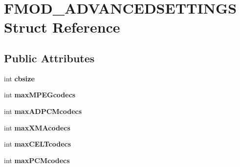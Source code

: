 \hypertarget{struct_f_m_o_d___a_d_v_a_n_c_e_d_s_e_t_t_i_n_g_s}{\section{F\-M\-O\-D\-\_\-\-A\-D\-V\-A\-N\-C\-E\-D\-S\-E\-T\-T\-I\-N\-G\-S Struct Reference}
\label{struct_f_m_o_d___a_d_v_a_n_c_e_d_s_e_t_t_i_n_g_s}
}
\subsection*{Public Attributes}
\begin{DoxyCompactItemize}
\item 
\hypertarget{struct_f_m_o_d___a_d_v_a_n_c_e_d_s_e_t_t_i_n_g_s_a45f37c714e81702c153beaeeaf5789d9}{int {\bfseries cbsize}}\label{struct_f_m_o_d___a_d_v_a_n_c_e_d_s_e_t_t_i_n_g_s_a45f37c714e81702c153beaeeaf5789d9}

\item 
\hypertarget{struct_f_m_o_d___a_d_v_a_n_c_e_d_s_e_t_t_i_n_g_s_ac38a94fd8d9b1ad4ed77d111cfcafa71}{int {\bfseries max\-M\-P\-E\-Gcodecs}}\label{struct_f_m_o_d___a_d_v_a_n_c_e_d_s_e_t_t_i_n_g_s_ac38a94fd8d9b1ad4ed77d111cfcafa71}

\item 
\hypertarget{struct_f_m_o_d___a_d_v_a_n_c_e_d_s_e_t_t_i_n_g_s_afebaec0ba3caa0367c9184416bd74f2a}{int {\bfseries max\-A\-D\-P\-C\-Mcodecs}}\label{struct_f_m_o_d___a_d_v_a_n_c_e_d_s_e_t_t_i_n_g_s_afebaec0ba3caa0367c9184416bd74f2a}

\item 
\hypertarget{struct_f_m_o_d___a_d_v_a_n_c_e_d_s_e_t_t_i_n_g_s_a4c351e7bc430c6c9aa9c87ad5fae8324}{int {\bfseries max\-X\-M\-Acodecs}}\label{struct_f_m_o_d___a_d_v_a_n_c_e_d_s_e_t_t_i_n_g_s_a4c351e7bc430c6c9aa9c87ad5fae8324}

\item 
\hypertarget{struct_f_m_o_d___a_d_v_a_n_c_e_d_s_e_t_t_i_n_g_s_a0f51ebed22a9eda603d37e2f9ccf5376}{int {\bfseries max\-C\-E\-L\-Tcodecs}}\label{struct_f_m_o_d___a_d_v_a_n_c_e_d_s_e_t_t_i_n_g_s_a0f51ebed22a9eda603d37e2f9ccf5376}

\item 
\hypertarget{struct_f_m_o_d___a_d_v_a_n_c_e_d_s_e_t_t_i_n_g_s_a4fc5ae4871fcfea0c82f818c6f7a9128}{int {\bfseries max\-P\-C\-Mcodecs}}\label{struct_f_m_o_d___a_d_v_a_n_c_e_d_s_e_t_t_i_n_g_s_a4fc5ae4871fcfea0c82f818c6f7a9128}


\end{DoxyCompactItemize}
